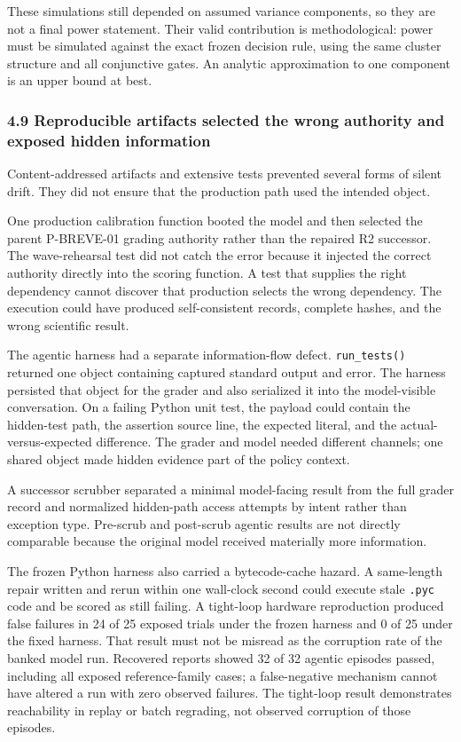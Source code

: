 \documentclass[
]{article}
\begin{document}
These simulations still depended on assumed variance components, so they
are not a final power statement. Their valid contribution is
methodological: power must be simulated against the exact frozen
decision rule, using the same cluster structure and all conjunctive
gates. An analytic approximation to one component is an upper bound at
best.

\subsubsection{4.9 Reproducible artifacts selected the wrong authority
and exposed hidden
information}\label{49-reproducible-artifacts-selected-the-wrong-authority-and-exposed-hidden-information}

Content-addressed artifacts and extensive tests prevented several forms
of silent drift. They did not ensure that the production path used the
intended object.

One production calibration function booted the model and then selected
the parent P-BREVE-01 grading authority rather than the repaired R2
successor. The wave-rehearsal test did not catch the error because it
injected the correct authority directly into the scoring function. A
test that supplies the right dependency cannot discover that production
selects the wrong dependency. The execution could have produced
self-consistent records, complete hashes, and the wrong scientific
result.

The agentic harness had a separate information-flow defect.
\texttt{run\_tests()} returned one object containing captured standard
output and error. The harness persisted that object for the grader and
also serialized it into the model-visible conversation. On a failing
Python unit test, the payload could contain the hidden-test path, the
assertion source line, the expected literal, and the
actual-versus-expected difference. The grader and model needed different
channels; one shared object made hidden evidence part of the policy
context.

A successor scrubber separated a minimal model-facing result from the
full grader record and normalized hidden-path access attempts by intent
rather than exception type. Pre-scrub and post-scrub agentic results are
not directly comparable because the original model received materially
more information.

The frozen Python harness also carried a bytecode-cache hazard. A
same-length repair written and rerun within one wall-clock second could
execute stale \texttt{.pyc} code and be scored as still failing. A
tight-loop hardware reproduction produced false failures in 24 of 25
exposed trials under the frozen harness and 0 of 25 under the fixed
harness. That result must not be misread as the corruption rate of the
banked model run. Recovered reports showed 32 of 32 agentic episodes
passed, including all exposed reference-family cases; a false-negative
mechanism cannot have altered a run with zero observed failures. The
tight-loop result demonstrates reachability in replay or batch
regrading, not observed corruption of those episodes.
\end{document}
